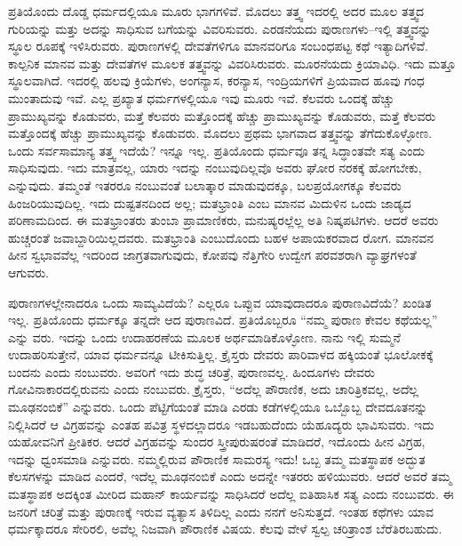 ಪ್ರತಿಯೊಂದು ದೊಡ್ಡ ಧರ್ಮದಲ್ಲಿಯೂ ಮೂರು ಭಾಗಗಳಿವೆ. ಮೊದಲು ತತ್ತ್ವ ಇದರಲ್ಲಿ ಅದರ ಮೂಲ ತತ್ತ್ವದ ಗುರಿಯನ್ನು ಮತ್ತು ಅದನ್ನು ಸಾಧಿಸುವ ಬಗೆಯನ್ನು ವಿವರಿಸುವರು. ಎರಡನೆಯದು ಪುರಾಣಗಳು–ಇಲ್ಲಿ ತತ್ತ್ವವನ್ನು ಸ್ಥೂಲ ರೂಪಕ್ಕೆ ಇಳಿಸಿರುವರು. ಪುರಾಣಗಳಲ್ಲಿ ದೇವತೆಗಳಿಗೂ ಮಾನವರಿಗೂ ಸಂಬಂಧಪಟ್ಟ ಕಥೆ ಇತ್ಯಾದಿಗಳಿವೆ. ಕಾಲ್ಪನಿಕ ಮಾನವ ಮತ್ತು ದೇವತೆಗಳ ಮೂಲಕ ತತ್ತ್ವವನ್ನು ವಿವರಿಸಿರುವರು. ಮೂರನೆಯದು ಕ್ರಿಯಾವಿಧಿ. ಇದು ಮತ್ತೂ ಸ್ಥೂಲವಾಗಿದೆ. ಇದರಲ್ಲಿ ಹಲವು ಕ್ರಿಯೆಗಳು, ಅಂಗನ್ಯಾಸ, ಕರನ್ಯಾಸ, ಇಂದ್ರಿಯಗಳಿಗೆ ಪ್ರಿಯವಾದ ಹೂವು ಗಂಧ ಮುಂತಾದುವು ಇವೆ. ಎಲ್ಲ ಪ್ರಖ್ಯಾತ ಧರ್ಮಗಳಲ್ಲಿಯೂ ಇವು ಮೂರು ಇವೆ. ಕೆಲವರು ಒಂದಕ್ಕೆ ಹೆಚ್ಚು ಪ್ರಾಮುಖ್ಯವನ್ನು ಕೊಡುವರು, ಮತ್ತೆ ಕೆಲವರು ಮತ್ತೊಂದಕ್ಕೆ ಹೆಚ್ಚು ಪ್ರಾಮುಖ್ಯವನ್ನು ಕೊಡುವರು, ಮತ್ತೆ ಕೆಲವರು ಮತ್ತೊಂದಕ್ಕೆ ಹೆಚ್ಚು ಪ್ರಾಮುಖ್ಯವನ್ನು ಕೊಡುವರು. ಮೊದಲು ಪ್ರಥಮ ಭಾಗವಾದ ತತ್ತ್ವವನ್ನು ತೆಗೆದುಕೊಳ್ಳೋಣ. ಒಂದು ಸರ್ವಸಾಮಾನ್ಯ ತತ್ತ್ವ ಇದೆಯೆ? ಇನ್ನೂ ಇಲ್ಲ. ಪ್ರತಿಯೊಂದು ಧರ್ಮವೂ ತನ್ನ ಸಿದ್ಧಾಂತವೇ ಸತ್ಯ ಎಂದು ಸಾಧಿಸುವುದು. ಇದು ಮಾತ್ರವಲ್ಲ, ಯಾರು ಇದನ್ನು ನಂಬುವುದಿಲ್ಲವೊ ಅವರು ಘೋರ ನರಕಕ್ಕೆ ಹೋಗಬೇಕು, ಎನ್ನುವುದು. ತಮ್ಮಂತೆ ಇತರರೂ ನಂಬುವಂತೆ ಬಲಾತ್ಕಾರ ಮಾಡುವುದಕ್ಕೂ, ಬಲಪ್ರಯೋಗಕ್ಕೂ ಕೆಲವರು ಹಿಂಜರಿಯುವುದಿಲ್ಲ. ಇದು ದುಷ್ಟತನದಿಂದ ಅಲ್ಲ; ಮತಭ್ರಾಂತಿ ಎಂಬ ಮಾನವ ಮಿದುಳಿನ ಒಂದು ಜಾಡ್ಯದ ಪರಿಣಾಮದಿಂದ. ಈ ಮತಭ್ರಾಂತರು ತುಂಬಾ ಪ್ರಾಮಾಣಿಕರು, ಮನುಷ್ಯರಲ್ಲೆಲ್ಲ ಅತಿ ನಿಷ್ಕಪಟಿಗಳು. ಆದರೆ ಅವರು ಹುಚ್ಚರಂತೆ ಜವಾಬ್ದಾರಿಯಿಲ್ಲದವರು. ಮತಭ್ರಾಂತಿ ಎಂಬುದೊಂದು ಬಹಳ ಅಪಾಯಕರವಾದ ರೋಗ. ಮಾನವನ ಹೀನ ಸ್ವಭಾವವೆಲ್ಲ ಇದರಿಂದ ಜಾಗ್ರತವಾಗುವುದು, ಕೋಪವು ನೆತ್ತಿಗೇರಿ ಉದ್ವೇಗ ಪರವಶರಾಗಿ ವ್ಯಾಘ್ರಗಳಂತೆ ಆಗುವರು.

ಪುರಾಣಗಳಲ್ಲೇನಾದರೂ ಒಂದು ಸಾಮ್ಯವಿದೆಯೆ? ಎಲ್ಲರೂ ಒಪ್ಪುವ ಯಾವುದಾದರೂ ಪುರಾಣವಿದೆಯೆ? ಖಂಡಿತ ಇಲ್ಲ. ಪ್ರತಿಯೊಂದು ಧರ್ಮಕ್ಕೂ ತನ್ನದೇ ಆದ ಪುರಾಣವಿದೆ. ಪ್ರತಿಯೊಬ್ಬರೂ “ನಮ್ಮ ಪುರಾಣ ಕೇವಲ ಕಥೆಯಲ್ಲ” ಎನ್ನು ವರು. ಇದನ್ನು ಒಂದು ಉದಾಹರಣೆಯ ಮೂಲಕ ಅರ್ಥಮಾಡಿಕೊಳ್ಳೋಣ. ನಾನು ಇಲ್ಲಿ ಸುಮ್ಮನೆ ಉದಾಹರಿಸುತ್ತೇನೆ, ಯಾವ ಧರ್ಮವನ್ನೂ ಟೀಕಿಸುತ್ತಿಲ್ಲ. ಕ್ರೈಸ್ತರು ದೇವರು ಪಾರಿವಾಳದ ಹಕ್ಕಿಯಂತೆ ಭೂಲೋಕಕ್ಕೆ ಬಂದನು ಎಂದು ನಂಬುವರು. ಅವರಿಗೆ ಇದು ಶುದ್ಧ ಚರಿತ್ರೆ, ಪುರಾಣವಲ್ಲ. ಹಿಂದೂಗಳು ದೇವರು ಗೋವಿನಾಕಾರದಲ್ಲಿರುವನು ಎಂದು ನಂಬುವರು. ಕ್ರೈಸ್ತರು, “ಅದೆಲ್ಲ ಪೌರಾಣಿಕ, ಅದು ಚಾರಿತ್ರಿಕವಲ್ಲ, ಅದೆಲ್ಲ ಮೂಢನಂಬಿಕೆ” ಎನ್ನುವರು. ಒಂದು ಪೆಟ್ಟಿಗೆಯಂತೆ ಮಾಡಿ ಎರಡು ಕಡೆಗಳಲ್ಲಿಯೂ ಒಬ್ಬೊಬ್ಬ ದೇವದೂತನನ್ನು ನಿಲ್ಲಿಸಿದರೆ ಆ ವಿಗ್ರಹವನ್ನು ಎಂತಹ ಪವಿತ್ರ ಸ್ಥಳದಲ್ಲಾದರೂ ಇಡಬಹುದೆಂದು ಯೆಹೂದ್ಯರು ಭಾವಿಸುವರು. ಇದು ಯಹೋವನಿಗೆ ಪ್ರೀತಿಕರ. ಆದರೆ ವಿಗ್ರಹವನ್ನು ಸುಂದರ ಸ್ತ್ರೀಪುರುಷರಂತೆ ಮಾಡಿದರೆ, ಇದೊಂದು ಹೀನ ವಿಗ್ರಹ, ಇದನ್ನು ಧ್ವಂಸಮಾಡಿ ಎನ್ನುವರು. ನಮ್ಮಲ್ಲಿರುವ ಪೌರಾಣಿಕ ಸಾಮರಸ್ಯ ಇದು! ಒಬ್ಬ ತಮ್ಮ ಮತಸ್ಥಾಪಕ ಅದ್ಭುತ ಕೆಲಸಗಳನ್ನು ಮಾಡಿದ ಎಂದರೆ, ಇದೆಲ್ಲ ಮೂಢನಂಬಿಕೆ ಎಂದು ಅದನ್ನೇ ಇತರರು ಹಳಿಯುವರು. ಆದರೆ ಅವರೆ ತಮ್ಮ ಮತಸ್ಥಾಪಕ ಅದಕ್ಕಿಂತ ಮೀರಿದ ಮಹಾನ್​ ಕಾರ್ಯವನ್ನು ಸಾಧಿಸಿದರೆ ಅದೆಲ್ಲ ಐತಿಹಾಸಿಕ ಸತ್ಯ ಎಂದು ನಂಬುವರು. ಈ ಜನರಿಗೆ ಚರಿತ್ರೆ ಮತ್ತು ಪುರಾಣಕ್ಕೆ ಇರುವ ವ್ಯತ್ಯಾಸ ತಿಳಿದಿಲ್ಲ ಎಂದು ನನಗೆ ಅನಿಸುತ್ತದೆ. ಇಂತಹ ಕಥೆಗಳು ಯಾವ ಧರ್ಮಕ್ಕಾದರೂ ಸೇರಿರಲಿ, ಅವೆಲ್ಲ ನಿಜವಾಗಿ ಪೌರಾಣಿಕ ವಿಷಯ. ಕೆಲವು ವೇಳೆ ಸ್ವಲ್ಪ ಚರಿತ್ರಾಂಶ ಬೆರೆತಿರಬಹುದು.

